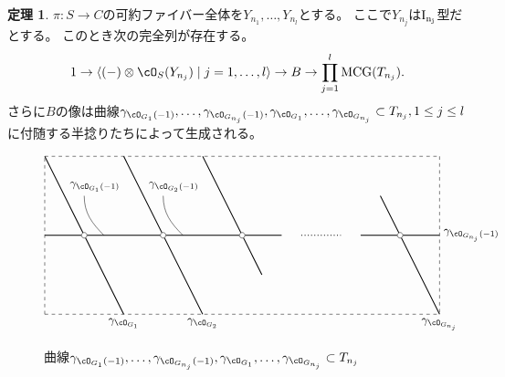 \documentclass[uplatex,a4paper,dvipdfmx]{jsarticle}
\numberwithin{equation}{section}
\theoremstyle{definition}
\newtheorem{theorem}{定理}[section]
\DeclareMathOperator{\MCG}{\mathrm{MCG}}
\begin{document}
\begin{theorem}
	$\pi \colon S \to C$の可約ファイバー全体を$Y_{n_1}, \dots, Y_{n_l}$とする。
	ここで$Y_{n_j}$は$\rm{I}_{n_j}$型だとする。
	このとき次の完全列が存在する。
	\begin{equation}
		1 \to \langle (-)\otimes \cO_S(Y_{n_j}) \mid j = 1, \dots, l\rangle \to B \to \prod_{j=1}^l \MCG(T_{n_j}).
	\end{equation}
	さらに$B$の像は曲線$\gamma_{\cO_{G_1}(-1)}, \dots, \gamma_{\cO_{G_{n_j}}(-1)}, \gamma_{\cO_{G_1}}, \dots, \gamma_{\cO_{G_{n_j}}} \subset T_{n_j}, 1\leq j \leq l$に付随する半捻りたちによって生成される。
	\begin{figure}[h]
		\centering
		\begin{displaymath}
			\begin{tikzpicture}[scale=1.2]
				\draw[dashed] (0,0)--(10,0);
				\draw[dashed] (0,0)--(0,4);
				\draw[dashed] (0,4)--(10,4);
				\draw[dashed] (10,4)--(10,0);

				\draw[thick] (0, 2)--(1, 2);
				\draw[thick] (1, 2)--(3, 2);
				\draw[thick] (3, 2)--(5, 2);
				\draw[thick] (5, 2)--(6, 2);
				\draw[thick] (8, 2)--(9, 2);
				\draw[thick] (9, 2)--(10, 2);


				\draw[thick] (0, 4)--(1, 2);
				\draw[thick] (1, 2)--(2, 0);
				\draw[thick] (2, 4)--(4, 0);
				\draw[thick] (4, 4)--(5, 2);
				\draw[thick] (5, 2)--(5.5, 1);
				\draw[thick] (8.5, 3)--(9, 2);
				\draw[thick] (9, 2)--(10, 0);

				\draw[dotted, thick] (5+1.5, 2)--(9-1.5, 2);
				\foreach \u in {1, 3, 5, 9}
					{
						\filldraw[white] (\u, 2) circle (2pt);
						\draw[black] (\u, 2) circle (2pt);
					}

				\draw(2, 0) node[below]{$\gamma_{\cO_{G_1}}$};
				\draw(4, 0) node[below]{$\gamma_{\cO_{G_2}}$};
				\draw(10, 0) node[below]{$\gamma_{\cO_{G_{n_j}}}$};

				\draw(2, 3) node[above left]{$\gamma_{\cO_{G_1}(-1)}$};
				\draw(1, 3) to[out=-90,in=135](1.5, 2);
				\draw(4, 3) node[above left]{$\gamma_{\cO_{G_2}(-1)}$};
				\draw(3, 3) to[out=-90,in=135](3.5, 2);

				\draw(10, 2) node[right]{$\gamma_{\cO_{G_{n_j}}(-1)}$};

			\end{tikzpicture}
		\end{displaymath}
		\caption{曲線$\gamma_{\cO_{G_1}(-1)}, \dots, \gamma_{\cO_{G_{n_j}}(-1)}, \gamma_{\cO_{G_1}}, \dots, \gamma_{\cO_{G_{n_j}}} \subset T_{n_j}$}
	\end{figure}
\end{theorem}


\end{document}
